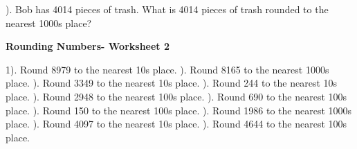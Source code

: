 \documentclass{article}%
\begin{document}
\newline%
\newline%
). Bob has 4014 pieces of trash. What is 4014 pieces of trash rounded to the nearest 1000s place?%
\newline%
\newline%
\newline%
\pagebreak%
\large%
\begin{center}%
\textbf{Rounding Numbers- Worksheet 2}%
\newline%
\newline%
\newline%
\end{center} \normalsize%
1). Round 8979 to the nearest 10s place.%
\newline%
\newline%
). Round 8165 to the nearest 1000s place.%
\newline%
\newline%
). Round 3349 to the nearest 10s place.%
\newline%
\newline%
). Round 244 to the nearest 10s place.%
\newline%
\newline%
). Round 2948 to the nearest 100s place.%
\newline%
\newline%
). Round 690 to the nearest 100s place.%
\newline%
\newline%
). Round 150 to the nearest 100s place.%
\newline%
\newline%
). Round 1986 to the nearest 1000s place.%
\newline%
\newline%
). Round 4097 to the nearest 10s place.%
\newline%
\newline%
). Round 4644 to the nearest 100s place.%
\newline%
\newline%
\end{document}
